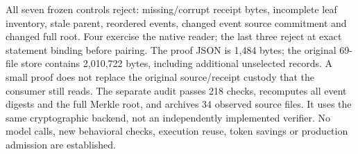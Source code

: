 All seven frozen controls reject: missing/corrupt receipt bytes, incomplete
leaf inventory, stale parent, reordered events, changed event source commitment
and changed full root. Four exercise the native reader; the last three reject
at exact statement binding before pairing. The proof JSON is 1,484 bytes;
the original 69-file store contains 2,010,722 bytes, including additional
unselected records. A small proof does not replace the original source/receipt
custody that the consumer still reads. The separate audit passes 218 checks,
recomputes all event digests and the full Merkle root, and archives 34 observed
source files. It uses the same cryptographic backend, not an independently
implemented verifier. No model calls, new behavioral checks, execution reuse,
token savings or production admission are established.

